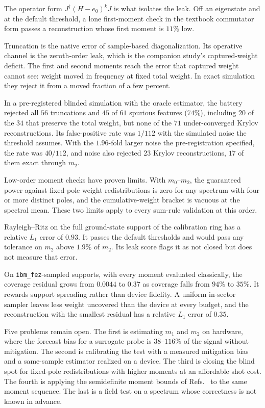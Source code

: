 \documentclass[submission, PhysCore]{SciPost}
\begin{document}
The operator form $J^\dagger(H-e_0)^kJ$ is what isolates the leak. Off an eigenstate and at the default threshold, a lone first-moment check in the textbook commutator form passes a reconstruction whose first moment is $11\%$ low.

Truncation is the native error of sample-based diagonalization. Its operative channel is the zeroth-order leak, which is the companion study's captured-weight deficit. The first and second moments reach the error that captured weight cannot see: weight moved in frequency at fixed total weight. In exact simulation they reject it from a moved fraction of a few percent.

In a pre-registered blinded simulation with the oracle estimator, the battery rejected all $56$ truncations and $45$ of $61$ spurious features ($74\%$), including $20$ of the $34$ that preserve the total weight, but none of the $71$ under-converged Krylov reconstructions. Its false-positive rate was $1/112$ with the simulated noise the threshold assumes. With the $1.96$-fold larger noise the pre-registration specified, the rate was $40/112$, and noise also rejected $23$ Krylov reconstructions, $17$ of them exact through $m_2$.

Low-order moment checks have proven limits. With $m_0$--$m_2$, the guaranteed power against fixed-pole weight redistributions is zero for any spectrum with four or more distinct poles, and the cumulative-weight bracket is vacuous at the spectral mean. These two limits apply to every sum-rule validation at this order.

Rayleigh--Ritz on the full ground-state support of the calibration ring has a relative $L_1$ error of $0.93$. It passes the default thresholds and would pass any tolerance on $m_2$ above $1.9\%$ of $m_2$. Its leak score flags it as not closed but does not measure that error.

On \texttt{ibm\_fez}-sampled supports, with every moment evaluated classically, the coverage residual grows from $0.0044$ to $0.37$ as coverage falls from $94\%$ to $35\%$. It rewards support spreading rather than device fidelity. A uniform in-sector sampler leaves less weight uncovered than the device at every budget, and the reconstruction with the smallest residual has a relative $L_1$ error of $0.35$.

Five problems remain open. The first is estimating $m_1$ and $m_2$ on hardware, where the forecast bias for a surrogate probe is $38$--$116\%$ of the signal without mitigation. The second is calibrating the test with a measured mitigation bias and a same-sample estimator realized on a device. The third is closing the blind spot for fixed-pole redistributions with higher moments at an affordable shot cost. The fourth is applying the semidefinite moment bounds of Refs.~\cite{WangAcin2024,Mortimer2026} to the same moment sequence. The last is a field test on a spectrum whose correctness is not known in advance.
\end{document}
